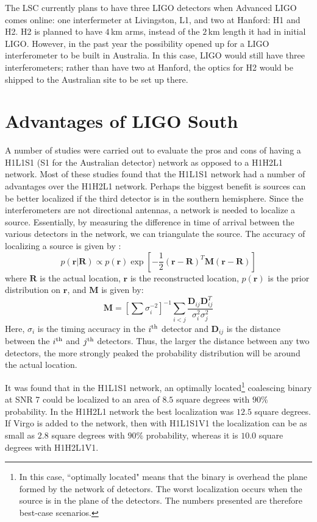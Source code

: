 
The \ac{LSC} currently plans to have three \ac{LIGO} detectors when Advanced
LIGO comes online: one interfermeter at Livingston, L1, and two at Hanford: H1
and H2. H2 is planned to have $4\,$km arms, instead of the $2\,$km length it
had in initial LIGO. However, in the past year the possibility opened up for a
\ac{LIGO} interferometer to be built in Australia. In this case, LIGO would
still have three interferometers; rather than have two at Hanford, the optics
for H2 would be shipped to the Australian site to be set up there.

\section{Advantages of LIGO South}

A number of studies were carried out to evaluate the pros and cons of having a
H1L1S1 (S1 for the Australian detector) network as opposed to a H1H2L1
network. Most of these studies found that the H1L1S1 network had a number of
advantages over the H1H2L1 network. Perhaps the biggest benefit is sources can
be better localized if the third detector is in the southern hemisphere. Since
the interferometers are not directional antennas, a network is needed to
localize a source. Essentially, by measuring the difference in time of arrival
between the various detectors in the network, we can triangulate the source.
The accuracy of localizing a source is given by \cite{Fairhurst2009,
wiki:ligoSth:localization}:
\begin{equation*}
p(\mathbf{r}|\mathbf{R}) \propto p(\mathbf{r})\exp\left[ -\frac{1}{2}(\mathbf{r} - \mathbf{R})^T \mathbf{M}(\mathbf{r}-\mathbf{R})\right]
\end{equation*}
where $\mathbf{R}$ is the actual location, $\mathbf{r}$ is the reconstructed location, $p(\mathbf{r})$ is the prior distribution on $\mathbf{r}$, and $\mathbf{M}$ is given by:
\begin{equation*}
\mathbf{M} = \left[\sum \sigma_i^{-2}\right]^{-1} \sum_{i<j} \frac{\mathbf{D}_{ij}\mathbf{D}^T_{ij}}{\sigma^2_i \sigma^2_j}
\end{equation*}
Here, $\sigma_i$ is the timing accuracy in the $i^{\mathrm{th}}$ detector and
$\mathbf{D}_{ij}$ is the distance between the $i^{\mathrm{th}}$ and $j^{\mathrm{th}}$ detectors.
Thus, the larger the distance between any two detectors, the more strongly
peaked the probability distribution will be around the actual location.

It was found \cite{wiki:ligoSth:localization} that in the H1L1S1 network, an
optimally located\footnote{In this case, ``optimally located" means that the
binary is overhead the plane formed by the network of detectors. The worst
localization occurs when the source is in the plane of the detectors. The
numbers presented are therefore best-case scenarios.} coalescing binary at \ac{SNR} 7
could be localized to an area of $8.5$ square degrees with $90\%$ probability.
In the H1H2L1 network the best localization was $12.5$ square degrees. If Virgo
is added to the network, then with H1L1S1V1 the localization can be as small as
$2.8$ square degrees with $90\%$ probability, whereas it is $10.0$ square
degrees with H1H2L1V1.

